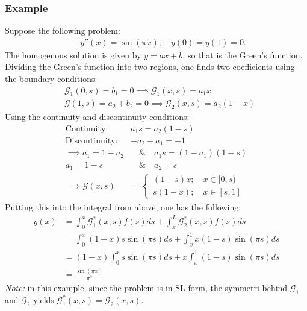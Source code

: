 \documentclass[12pt]{article}
\newcommand{\G}{\mathcal{G}}
\newcommand{\note}{\textit{Note: }}
\begin{document}
\subsubsection*{Example}
Suppose the following problem:
\begin{align*}
    &-y''(x) = \sin(\pi x);\quad y(0)=y(1) = 0.
\end{align*}The homogenous solution is given by $y = ax + b$, so that is the Green's function. Dividing the Green's function into two regions, one finds two coefficients using the boundary conditions:
\begin{align*}
    &\G_1(0,s) = b_1 = 0\implies \G_1(x,s) = a_1x\\
    &\G(1,s) = a_2 + b_2 = 0\implies \G_2(x,s) = a_2(1-x)
\end{align*}Using the continuity and discontinuity conditions:
\begin{align*}
    \text{Continuity: }&a_1s = a_2(1-s)\\
    \text{Discontinuity: }& -a_2 - a_1 = -1\\
    \implies a_1=1 - a_2 &\quad \&\quad  a_1s = (1- a_1)(1-s)\\
    a_1 = 1 - s&\quad\&\quad a_2 = s\\
    \implies \G(x,s) &= \begin{cases}
        (1-s)x;\quad x\in[0, s)\\
        s(1-x);\quad x\in[s,1]
    \end{cases}
\end{align*}Putting this into the integral from above, one has the following:
\begin{align*}
    y(x) &= \int_0^x \G_1^*(x,s)f(s)ds + \int_{x}^L\G_2^*(x,s)f(s)ds\\
    &= \int_{0}^x(1-x)s \sin(\pi s)ds + \int_{x}^1x(1-s)\sin(\pi s)ds\\
    &= (1-x)\int_{0}^xs \sin(\pi s)ds + x\int_{x}^1(1-s)\sin(\pi s)ds\\
    &= \frac{\sin(\pi x)}{\pi^2}
\end{align*}\note in this example, since the problem is in SL form, the symmetri behind $\G_1$ and $\G_2$ yields $\G_1^*(x,s) = \G_2(x,s)$.
\end{document}
